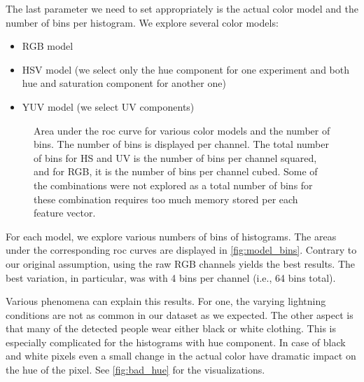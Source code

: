 The last parameter we need to set appropriately is the actual color model
and the number of bins per histogram. We explore several color models:

\begin{itemize}
    \item RGB model
    \item HSV model (we select only the hue component for one experiment and both hue and saturation component for another one)
    \item YUV model (we select UV components)
\end{itemize}

\begin{figure}
    \centering
    \def\svgwidth{\columnwidth}
    \Large
    \scalebox{0.7}{}
    \caption[Area under the ROC curve for various color models and the number of bins]{Area under the \gls{roc} curve for various color models and the number of bins. The number of bins is displayed per channel. The total number of bins for HS and UV is the number of bins per channel squared, and for RGB, it is the number of bins per channel cubed. Some of the combinations were not explored as a total number of bins for these combination requires too much memory stored per each feature vector.}
    \label{fig:model_bins}
\end{figure}

For each model, we explore various numbers of bins of histograms. The areas under the corresponding \gls{roc} curves are displayed in \autoref{fig:model_bins}. Contrary to our original assumption, using the raw RGB channels yields the best results. The best variation, in particular, was with 4 bins per channel (i.e., 64 bins total).

Various phenomena can explain this results. For one, the varying lightning
conditions are not as common in our dataset as we expected. The other aspect is that many of the detected people wear either black or white clothing. This is especially complicated for the histograms with hue component. In case of black and white pixels even a small change in the actual color have dramatic impact on the hue of the pixel. See \autoref{fig:bad_hue} for the visualizations. 

